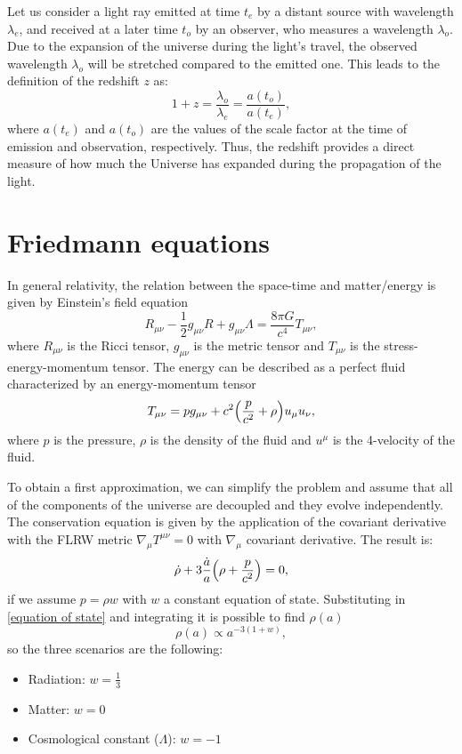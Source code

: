 Let us consider a light ray emitted at time \( t_e \) by a distant source with wavelength \( \lambda_e \), and received at a later time \( t_o \) by an observer, who measures a wavelength \( \lambda_o \). Due to the expansion of the universe during the light's travel, the observed wavelength \( \lambda_o \) will be stretched compared to the emitted one. This leads to the definition of the redshift \( z \) as:
\begin{equation} \label{redshift definition}
1 + z = \frac{\lambda_o}{\lambda_e} = \frac{a(t_o)}{a(t_e)},
\end{equation}
where \( a(t_e) \) and \( a(t_o) \) are the values of the scale factor at the time of emission and observation, respectively. Thus, the redshift provides a direct measure of how much the Universe has expanded during the propagation of the light.\\

\section{Friedmann equations}
In general relativity, the relation between the space-time and  matter/energy is given by Einstein's field equation
\begin{equation}
    R_{\mu \nu} - \frac{1}{2}g_{\mu \nu}R + g_{\mu \nu}\Lambda = \frac{8 \pi G}{c^4} T_{\mu \nu},
\end{equation}
where $R_{\mu \nu}$ is the Ricci tensor, $g_{\mu \nu}$ is the metric tensor and $T_{\mu \nu}$ is the stress-energy-momentum tensor.
The energy can be described as a perfect fluid characterized by an energy-momentum tensor
\begin{equation}
    T_{\mu \nu} = p g_{\mu \nu} + c^2 \qty(\frac{p}{c^2} + \rho) u_{\mu} u_{\nu},
\end{equation}
where $p$ is the pressure, $\rho$ is the density of the fluid and $u^\mu$ is the 4-velocity of the fluid.

To obtain a first approximation, we can simplify the problem and assume that all of the components of the universe are decoupled and they evolve independently. 
The conservation equation is given by the application of the covariant derivative with the FLRW metric $\nabla _\mu T^{\mu \nu} = 0$ with $\nabla _\mu$ covariant derivative.
The result is:
\begin{equation} \label{equation of state}
    \dot{\rho} + 3 \frac{\dot{a}}{a} \qty(\rho + \frac{p}{c^2}) = 0,
\end{equation}
if we assume $p = \rho w$ with $w$ a constant equation of state. Substituting in \eqref{equation of state} and integrating it is possible to find $\rho(a)$
\begin{equation}\label{integrated equation of state}
    \rho(a) \propto a^{-3(1+w)},
\end{equation}
so the three scenarios are the following:
\begin{itemize}
    \item Radiation: $w = \frac{1}{3}$
    \item Matter: $w = 0$
    \item Cosmological constant ($\Lambda$): $w = -1$
\end{itemize}

